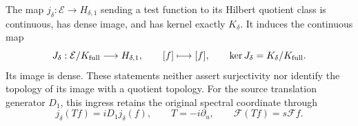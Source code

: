\begin{cqtheorem}
\label{thm:cq-sobolev-ingress}
The map $j_\delta:\mathcal E\to H_{\delta,1}$ sending a test function
to its Hilbert quotient class is continuous, has dense image, and
has kernel exactly $K_\delta$. It induces the continuous map
\begin{equation}\label{eq:cq-sobolev-quotient-map}
 J_\delta:\mathcal E/K_{\rm full}\longrightarrow H_{\delta,1},
 \qquad [f]\longmapsto[f],
 \qquad \ker J_\delta=K_\delta/K_{\rm full}.
\end{equation}
Its image is dense. These statements neither assert surjectivity
nor identify the topology of its image with a quotient topology.
For the source translation generator $D_1$, this ingress retains
the original spectral coordinate through
\begin{equation}\label{eq:cq-sobolev-generator}
 j_\delta(Tf)=iD_1j_\delta(f),
 \qquad T=-i\partial_u,\qquad \mathscr F(Tf)=s\mathscr Ff.
\end{equation}
\end{cqtheorem}
